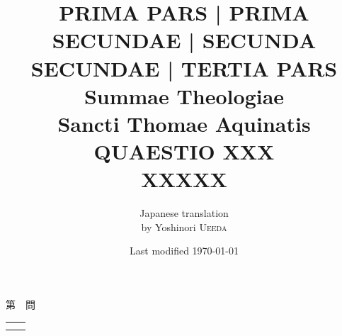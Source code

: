 \documentclass[paper=a4paper,fontsize=10pt,jafontsize=9pt,titlepage]{jlreq}
\title{{\bfseries PRIMA PARS | PRIMA SECUNDAE | SECUNDA SECUNDAE | TERTIA PARS}\\{\Huge Summae Theologiae}\\Sancti Thomae
Aquinatis\\{\sffamily QUAESTIO XXX}\\XXXXX}
\author{Japanese translation\\by Yoshinori {\scshape Ueeda}}
\date{Last modified \today}
\begin{document}
\maketitle
\pagestyle{fancy}

\begin{center}
{\Large 第　問\\}
\end{center}

\begin{longtable}{p{21em}p{21em}}


&



\\



&

 

\end{longtable}

\newpage
\end{document}
